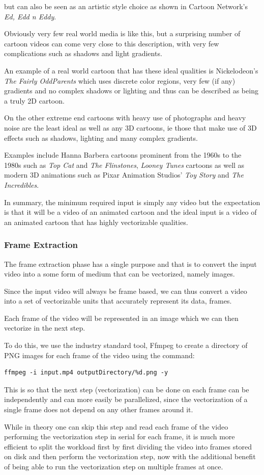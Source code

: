 \documentclass[12pt]{article}
\newcommand{\sentence}{} %
\newcommand{\italic}[1]{\textit{#1}}
\begin{document}
    but can also be seen as an artistic style choice as shown in Cartoon Network's \italic{Ed, Edd n Eddy}.
    \sentence
    Obviously very few real world media is like this, but a surprising number of cartoon videos can come very close
    to this description, with very few complications such as shadows and light gradients.
    \sentence
    An example of a real world cartoon that has these ideal qualities is Nickelodeon's \italic{The Fairly OddParents}
    which uses discrete color regions, very few (if any) gradients and no complex shadows or lighting and thus can be
    described as being a truly 2D cartoon.
    \sentence
    On the other extreme end cartoons with heavy use of photographs and heavy noise are the least ideal as well as
    any 3D cartoons, ie those that make use of 3D effects such as shadows, lighting and many complex gradients.
    \sentence
    Examples include Hanna Barbera cartoons prominent from the 1960s to the 1980s such as \italic{Top Cat} and
    \italic{The Flinstones}, \italic{Looney Tunes} cartoons as well as modern 3D animations such as Pixar Animation
    Studios' \italic{Toy Story} and \italic{The Incredibles}.
    \sentence
    In summary, the minimum required input is simply any video but the expectation is that it will be a video of an
    animated cartoon and the ideal input is a video of an animated cartoon that has highly vectorizable qualities.

    \subsubsection{Frame Extraction}\label{subsubsec:frame-extraction}

    \tab
    The frame extraction phase has a single purpose and that is to convert the input video into a some form of medium
    that can be vectorized, namely images.
    \sentence
    Since the input video will always be frame based, we can thus convert a video into a set of vectorizable units
    that accurately represent its data, frames.
    \sentence
    Each frame of the video will be represented in an image which we can then vectorize in the next step.
    \sentence
    To do this, we use the industry standard tool, Ffmpeg to create a directory of PNG images for each frame of the
    video using the command:
    \begin{verbatim}ffmpeg -i input.mp4 outputDirectory/%d.png -y
    \end{verbatim}
    \sentence
    This is so that the next step (vectorization) can be done on each frame can be independently and can more easily
    be parallelized, since the vectorization of a single frame does not depend on any other frames around it.
    \sentence
    While in theory one can skip this step and read each frame of the video performing the vectorization step in
    serial for each frame, it is much more efficient to split the workload first by first dividing the video into
    frames stored on disk and then perform the vectorization step, now with the additional benefit of being able to
    run the vectorization step on multiple frames at once.
\end{document}
